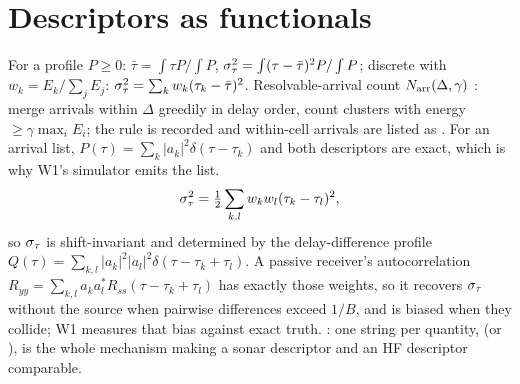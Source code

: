 \documentclass[10pt,a4paper]{article}
\begin{document}
\section{Descriptors as functionals}
For a profile $P\ge0$: $\bar\tau=\int\tau P/\int P$, $\sigma_{\tau}^2=\int(\tau-\bar\tau)^2P/\int P$; discrete with $w_k=E_k/\sum_jE_j$: $\sigma_{\tau}^2=\sum_kw_k(\tau_k-\bar\tau)^2$. Resolvable-arrival count $N_{\mathrm{arr}}(\Delta,\gamma)$ \tagP{}: merge arrivals within $\Delta$ greedily in delay order, count clusters with energy $\ge\gamma\max_iE_i$; the rule is recorded and within-cell arrivals are listed as . For an arrival list, $P(\tau)=\sum_k|a_k|^2\delta(\tau-\tau_k)$ and both descriptors are exact, which is why W1's simulator emits the list.
\begin{equation}
  \sigma_{\tau}^2=\tfrac12\sum_{k,l}w_kw_l(\tau_k-\tau_l)^2 ,
  \label{eq:pairwise}
\end{equation}
so $\sigma_{\tau}$ is shift-invariant and determined by the delay-difference profile $Q(\tau)=\sum_{k,l}|a_k|^2|a_l|^2\delta(\tau-\tau_k+\tau_l)$. A passive receiver's autocorrelation $R_{yy}=\sum_{k,l}a_ka_l^\ast R_{ss}(\tau-\tau_k+\tau_l)$ has exactly those weights, so it recovers $\sigma_{\tau}$ without the source when pairwise differences exceed $1/B$, and is biased when they collide; W1 measures that bias against exact truth. \tagG{}: one string per quantity,  (or ), is the whole mechanism making a sonar descriptor and an HF descriptor comparable.
\end{document}

